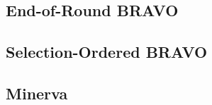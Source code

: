 \documentclass{article}
\begin{document}
\subsection{End-of-Round BRAVO}
\subsection{Selection-Ordered BRAVO}
\subsection{Minerva}
\end{document}
